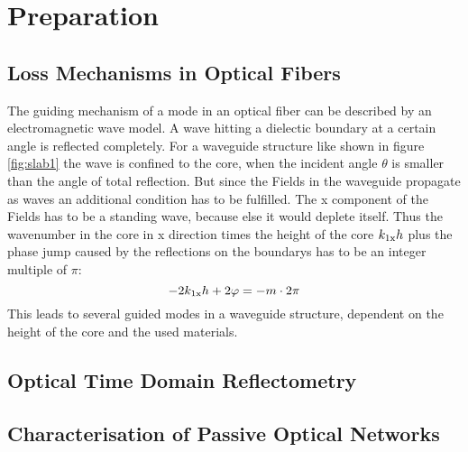 \chapter{Preparation}
\section{Loss Mechanisms in Optical Fibers}

The guiding mechanism of a mode in an optical fiber can be described by an electromagnetic wave model. A wave hitting a dielectic boundary at a certain angle is reflected completely. For a waveguide structure like shown in figure \ref{fig:slab1} the wave is confined to the core, when the incident angle $\theta$ is smaller than the angle of total reflection. But since the Fields in the waveguide propagate as waves an additional condition has to be fulfilled. The x component of the Fields has to be a standing wave, because else it would deplete itself. Thus the wavenumber in the core in x direction times the height of the core $k_{\mathrm{1x}}h$ plus the phase jump caused by the reflections on the boundarys has to be an integer multiple of $\pi$:
\begin{equation}
 -2k_{\mathrm{1x}}h+2\varphi = -m\cdot2\pi
\end{equation}
This leads to several guided modes in a waveguide structure, dependent on the height of the core and the used materials.



\section{Optical Time Domain Reflectometry}

\section{Characterisation of Passive Optical Networks}
